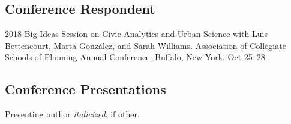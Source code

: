 \documentclass[12pt,letterpaper]{report}
\begin{document}
	\subsection*{Conference Respondent}
	
	\begin{tablist}
		
		\item[2018] \tab Big Ideas Session on Civic Analytics and Urban Science with Luis Bettencourt, Marta González, and Sarah Williams. Association of Collegiate Schools of Planning Annual Conference. Buffalo, New York. Oct 25--28.
		
	\end{tablist}
	
	\subsection*{Conference Presentations}
	
	Presenting author \textit{italicized}, if other.\bigskip
	
\end{document}
